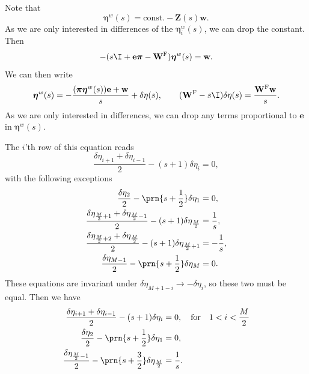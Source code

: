\documentclass[12pt]{article}
\newcommand{\onev}{\mathbf{e}}
\newcommand{\fund}{\mathbf{Z}}
\newcommand{\pib}{\boldsymbol{\pi}}
\newcommand{\etw}{\boldsymbol{\eta}^w}
\newcommand{\w}{\mathbf{w}}
\newcommand{\W}{\mathbf{W}}
\newcommand{\frg}{\W^{\mathrm{F}}}
\begin{document}
Note that
%
\begin{equation}\label{eq:etafund}
  \etw(s) = \text{const.} - \fund(s)\w.
\end{equation}
%
As we are only interested in differences of the $\etw_i(s)$, we can drop the constant.
Then
%
\begin{equation}\label{eq:etarecur}
  -(s\I + \onev\pib - \frg)\etw(s) = \w.
\end{equation}
%
We can then write
%
\begin{equation}\label{eq:detarecur}
  \etw(s) = -\frac{(\pib\etw(s))\onev+\w}{s} + \delta\eta(s),
  \qquad
  (\frg-s\I)\delta\eta(s) = \frac{\frg\w}{s}.
\end{equation}
%
As we are only interested in differences, we can drop any terms proportional to $\onev$ in $\etw(s)$.

The $i$'th row of this equation reads
%
\begin{equation}\label{eq:detarow}
  \frac{\delta\eta_{i+1}+\delta\eta_{i-1}}{2} - (s+1)\delta\eta_i = 0,
\end{equation}
%
with the following exceptions
%
\begin{equation}\label{eq:detabnduni}
\begin{aligned}
  \frac{\delta\eta_2}{2} - \prn{s+\frac{1}{2}}\delta\eta_1 &= 0, \\
  \frac{\delta\eta_{\frac{M}{2}+1}+\delta\eta_{\frac{M}{2}-1}}{2} - (s+1)\delta\eta_{\frac{M}{2}} &= \frac{1}{s},\\
  \frac{\delta\eta_{\frac{M}{2}+2}+\delta\eta_{\frac{M}{2}}}{2} - (s+1)\delta\eta_{\frac{M}{2}+1} &= -\frac{1}{s},\\
  \frac{\delta\eta_{M-1}}{2} - \prn{s+\frac{1}{2}}\delta\eta_M &= 0.
\end{aligned}
\end{equation}
%
These equations are invariant under $\delta\eta_{M+1-i} \to -\delta\eta_i$, so these two must be equal.
Then we have
%
\begin{equation}\label{eq:detahalf}
\begin{aligned}
  \frac{\delta\eta_{i+1}+\delta\eta_{i-1}}{2} - (s+1)\delta\eta_i &= 0,
  \quad\text{for}\quad 1<i<\frac{M}{2}\\
  \frac{\delta\eta_2}{2} - \prn{s+\frac{1}{2}}\delta\eta_1 &= 0, \\
  \frac{\delta\eta_{\frac{M}{2}-1}}{2} - \prn{s+\frac{3}{2}}\delta\eta_{\frac{M}{2}} &= \frac{1}{s}.
\end{aligned}
\end{equation}
%
\end{document}
